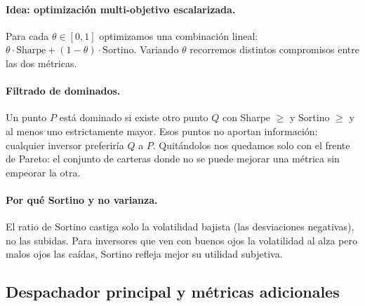 \documentclass[11pt,a4paper]{book}
\begin{document}
\paragraph{Idea: optimización multi-objetivo escalarizada.} Para cada $\theta \in [0,1]$ optimizamos una combinación lineal: $\theta \cdot \mathrm{Sharpe} + (1-\theta) \cdot \mathrm{Sortino}$. Variando $\theta$ recorremos distintos compromisos entre las dos métricas.

\paragraph{Filtrado de dominados.} Un punto $P$ está dominado si existe otro punto $Q$ con Sharpe $\ge$ y Sortino $\ge$ y al menos uno estrictamente mayor. Esos puntos no aportan información: cualquier inversor preferiría $Q$ a $P$. Quitándolos nos quedamos solo con el frente de Pareto: el conjunto de carteras donde no se puede mejorar una métrica sin empeorar la otra.

\paragraph{Por qué Sortino y no varianza.} El ratio de Sortino castiga solo la volatilidad bajista (las desviaciones negativas), no las subidas. Para inversores que ven con buenos ojos la volatilidad al alza pero malos ojos las caídas, Sortino refleja mejor su utilidad subjetiva.

\subsection{Despachador principal y métricas adicionales}
\end{document}

